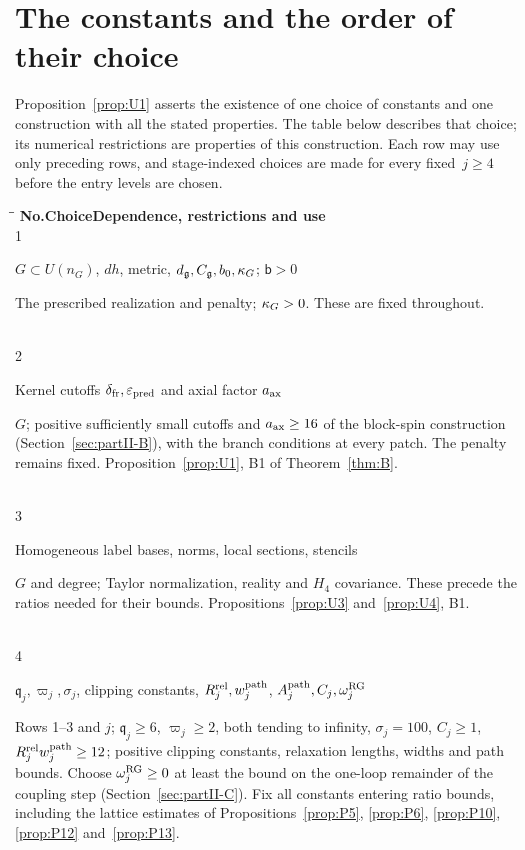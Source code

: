 \section{The constants and the order of their choice}\label{sec:constants}

Proposition~\ref{prop:U1} asserts the existence of one choice of constants and one construction with all the stated properties. The table below describes that choice; its numerical restrictions are properties of this construction. Each row may use only preceding rows, and stage-indexed choices are made for every fixed~$j\ge4$ before the entry levels are chosen.

\label{tab:constant-choices}
\begingroup
\begin{tabbing}
\hspace{2.4em}\=\hspace{0.27\linewidth}\=\kill
\textbf{No.}\>\textbf{Choice}\>\textbf{Dependence, restrictions and use}\\[0.4em]
1\>\parbox[t]{0.26\linewidth}{\raggedright $G\subset U(n_G)$, $dh$, metric, $d_{\mathfrak{g}},C_{\mathfrak{g}},b_0,\kappa_G$; $\mathsf b>0$}\>\parbox[t]{0.67\linewidth}{\raggedright The prescribed realization and penalty; $\kappa_G>0$. These are fixed throughout.}\\[0.45em]
2\>\parbox[t]{0.26\linewidth}{\raggedright Kernel cutoffs $\delta_{\rm fr},\varepsilon_{\rm pred}$ and axial factor $a_{\rm ax}$}\>\parbox[t]{0.67\linewidth}{\raggedright $G$; positive sufficiently small cutoffs and $a_{\rm ax}\ge16$ of the block-spin construction (Section~\ref{sec:partII-B}), with the branch conditions at every patch. The penalty remains fixed. Proposition~\ref{prop:U1}, B1 of Theorem~\ref{thm:B}.}\\[0.45em]
3\>\parbox[t]{0.26\linewidth}{\raggedright Homogeneous label bases, norms, local sections, stencils}\>\parbox[t]{0.67\linewidth}{\raggedright $G$ and degree; Taylor normalization, reality and $H_4$ covariance. These precede the ratios needed for their bounds. Propositions~\ref{prop:U3} and~\ref{prop:U4}, B1.}\\[0.45em]
4\>\parbox[t]{0.26\linewidth}{\raggedright $\mathfrak q_j,\varpi_j,\sigma_j$, clipping constants, $R_j^{\rm rel},w_j^{\rm path}$, $A_j^{\rm path},C_j,\omega_j^{\rm RG}$}\>\parbox[t]{0.67\linewidth}{\raggedright Rows 1--3 and $j$; $\mathfrak q_j\ge6$, $\varpi_j\ge2$, both tending to infinity, $\sigma_j=100$, $C_j\ge1$, $R_j^{\rm rel}w_j^{\rm path}\ge12$; positive clipping constants, relaxation lengths, widths and path bounds. Choose $\omega_j^{\rm RG}\ge0$ at least the bound on the one-loop remainder of the coupling step (Section~\ref{sec:partII-C}). Fix all constants entering ratio bounds, including the lattice estimates of Propositions~\ref{prop:P5}, \ref{prop:P6}, \ref{prop:P10}, \ref{prop:P12} and~\ref{prop:P13}.}\\[0.45em]

\end{tabbing}
